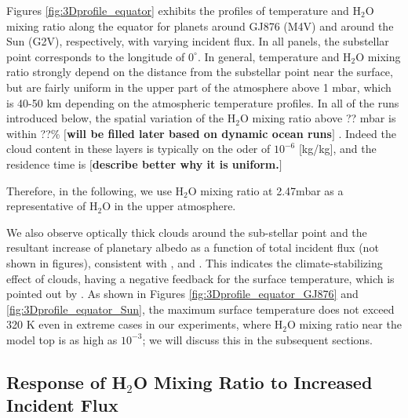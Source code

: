 \documentclass[11pt,numberedappendix,twocolappendix,]{emulateapj}
\def\water{H$_2$O }
\def\preslevel{2.47}
\def\memo#1{\color{red}$[${\bf #1}$]$ \color{black}}
\begin{document}
Figures \ref{fig:3Dprofile_equator} exhibits the profiles of temperature and \water mixing ratio along the equator for planets around GJ876 (M4V) and around the Sun (G2V), respectively, with varying incident flux. 
In all panels, the substellar point corresponds to the longitude of $0^{\circ }$. 
In general, temperature and \water mixing ratio strongly depend on the distance from the substellar point near the surface, but are fairly uniform in the upper part of the atmosphere above 1 mbar, which is 40-50 km depending on the atmospheric temperature profiles. 
In all of the runs introduced below, the spatial variation of the \water mixing ratio above ?? mbar is within ??\% \memo{will be filled later based on dynamic ocean runs}. 
Indeed the cloud content in these layers is typically on the oder of $10^{-6} $ [kg/kg], and the residence time is \memo{describe better why it is uniform.}

Therefore, in the following, we use \water mixing ratio at \preslevel mbar as a representative of \water in the upper atmosphere. 



We also observe optically thick clouds around the sub-stellar point and the resultant increase of planetary albedo as a function of total incident flux (not shown in figures), consistent with \citet{Yang2013,Yang2014}, \citet{Kopparapu2016} and \citet{Way2016}. 
This indicates the climate-stabilizing effect of clouds, having a negative feedback for the surface temperature, which is pointed out by \citet{Yang2013}. 
As shown in Figures \ref{fig:3Dprofile_equator_GJ876} and \ref{fig:3Dprofile_equator_Sun}, the maximum surface temperature does not exceed 320 K even in extreme cases in our experiments, where \water mixing ratio near the model top is as high as $10^{-3}$; we will discuss this in the subsequent sections. 


\subsection{Response of \water Mixing Ratio to Increased Incident Flux}
\label{ss:result_H2Omixingratio}
\end{document}
